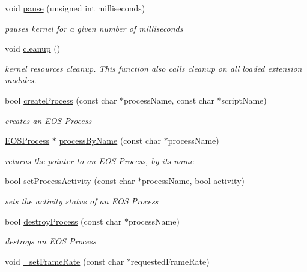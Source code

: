 \begin{CompactItemize}
void \hyperlink{structEOSKernel_c951ed12c4318cb8272849abf124ee51}{pause} (unsigned int milliseconds)
\begin{CompactList}\small\item\em pauses kernel for a given number of milliseconds \item\end{CompactList}\item 
void \hyperlink{structEOSKernel_f9ca04a44a732ba92ff65927f3757ffd}{cleanup} ()
\begin{CompactList}\small\item\em kernel resources cleanup. This function also calls cleanup on all loaded extension modules. \item\end{CompactList}\item 
bool \hyperlink{structEOSKernel_a58308c8aa2b19378d24af1cb51b78d2}{createProcess} (const char $\ast$processName, const char $\ast$scriptName)
\begin{CompactList}\small\item\em creates an EOS Process \item\end{CompactList}\item 
\hyperlink{classEOSProcess}{EOSProcess} $\ast$ \hyperlink{structEOSKernel_9b9fa8938a1ad005b3b55df2aa4ba32c}{processByName} (const char $\ast$processName)
\begin{CompactList}\small\item\em returns the pointer to an EOS Process, by its name \item\end{CompactList}\item 
bool \hyperlink{structEOSKernel_9ab346976e19d85ebfbad260b3913734}{setProcessActivity} (const char $\ast$processName, bool activity)
\begin{CompactList}\small\item\em sets the activity status of an EOS Process \item\end{CompactList}\item 
bool \hyperlink{structEOSKernel_214499b9e8c0ab67eddd377a780cb3fa}{destroyProcess} (const char $\ast$processName)
\begin{CompactList}\small\item\em destroys an EOS Process \item\end{CompactList}\item 
void \hyperlink{structEOSKernel_4b51e69b7ddd8e0fa02a339dfb5f86f9}{\_\-setFrameRate} (const char $\ast$requestedFrameRate)

\end{CompactItemize}
